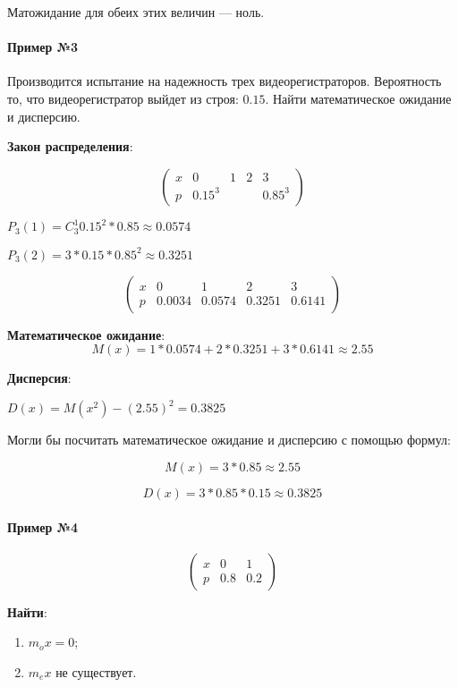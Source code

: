 \documentclass{article}
\begin{document}
Матожидание для обеих этих величин — ноль.

\paragraph{Пример №3}

Производится испытание на надежность трех видеорегистраторов. Вероятность то, что видеорегистратор выйдет из строя: $0.15$. Найти математическое ожидание и дисперсию.

\textbf{Закон распределения}:

$$
\begin{pmatrix}
    x & 0 & 1 & 2 & 3 \\
    p & 0.15^3 & & & 0.85^3
\end{pmatrix}
$$

$P_3(1) = C_{3}^{1} 0.15^2 * 0.85 \approx 0.0574$

$P_3(2) = 3 * 0.15 * 0.85^2 \approx 0.3251$

$$
\begin{pmatrix}
    x & 0 & 1 & 2 & 3 \\
    p & 0.0034 & 0.0574 & 0.3251 & 0.6141
\end{pmatrix}
$$

\textbf{Математическое ожидание}: $$M(x) = 1 * 0.0574 + 2 * 0.3251 + 3 * 0.6141 \approx 2.55$$

\textbf{Дисперсия}:

$D(x) = M(x^2) - (2.55)^2 = 0.3825$

Могли бы посчитать математическое ожидание и дисперсию с помощью формул:

$$
M(x) = 3 * 0.85 \approx 2.55
$$

$$
D(x) = 3 * 0.85 * 0.15 \approx 0.3825
$$

\paragraph{Пример №4}

$$
\begin{pmatrix}
    x & 0 & 1 \\
    p & 0.8 & 0.2
\end{pmatrix}
$$

\textbf{Найти}:

\begin{enumerate}
    \item $m_{o} x = 0$;
    \item $m_{e} x$ не существует.
\end{enumerate}
\end{document}
